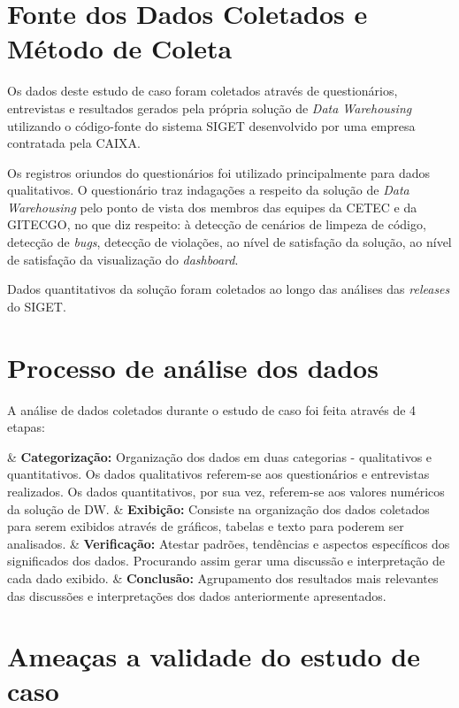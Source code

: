\section{Fonte dos Dados Coletados e Método de Coleta}
\label{sec:fonte} 

Os dados deste estudo de caso foram coletados através de questionários, entrevistas e resultados gerados pela própria solução de \textit{Data Warehousing} utilizando o código-fonte do sistema SIGET desenvolvido por uma empresa contratada pela CAIXA.

Os registros oriundos do questionários foi utilizado principalmente para dados qualitativos. O questionário traz indagações a respeito da solução de \textit{Data Warehousing} pelo ponto de vista dos membros das equipes da CETEC e da GITECGO, no que diz respeito: à detecção de cenários de limpeza de código, detecção de \textit{bugs}, detecção de violações, ao nível de satisfação da solução, ao nível de satisfação da visualização do \textit{dashboard}.

Dados quantitativos da solução foram coletados ao longo das análises das \textit{releases} do SIGET.


\section{Processo de análise dos dados}
\label{sec:analise} 

A análise de dados coletados durante o estudo de caso foi feita através de 4 etapas:

\begin{easylist}[itemize]	
	
	& \textbf{Categorização: } Organização dos dados em duas categorias - qualitativos e quantitativos. Os dados qualitativos referem-se aos questionários e entrevistas realizados. Os dados quantitativos, por sua vez, referem-se aos valores numéricos da solução de DW. 
	& \textbf{Exibição: } Consiste na organização dos dados coletados para serem exibidos através de gráficos, tabelas e texto para poderem ser analisados. 
	& \textbf{Verificação: } Atestar padrões, tendências e aspectos específicos dos significados dos dados. Procurando assim gerar uma discussão e interpretação de cada dado exibido.
	& \textbf{Conclusão: } Agrupamento dos resultados mais relevantes das discussões e interpretações dos dados anteriormente apresentados.
	
	\end{easylist}	


\section{Ameaças a validade do estudo de caso}
\label{sec:validade} 

